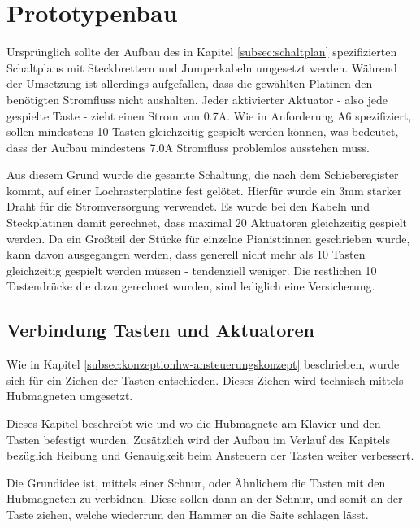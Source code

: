 \section{Prototypenbau} \label{Prototyp}

Ursprünglich sollte der Aufbau des in Kapitel \ref{subsec:schaltplan} spezifizierten Schaltplans mit Steckbrettern und Jumperkabeln umgesetzt werden.
Während der Umsetzung ist allerdings aufgefallen, dass die gewählten Platinen den benötigten Stromfluss nicht aushalten. \newline
Jeder aktivierter Aktuator - also jede gespielte Taste - zieht einen Strom von 0.7A.
Wie in Anforderung A6 spezifiziert, sollen mindestens 10 Tasten gleichzeitig gespielt werden können, was bedeutet, dass der Aufbau mindestens 7.0A Stromfluss problemlos ausstehen muss.

Aus diesem Grund wurde die gesamte Schaltung, die nach dem Schieberegister kommt, auf einer Lochrasterplatine fest gelötet.
Hierfür wurde ein 3mm starker Draht für die Stromversorgung verwendet. \newline
Es wurde bei den Kabeln und Steckplatinen damit gerechnet, dass maximal 20 Aktuatoren gleichzeitig gespielt werden.
Da ein Großteil der Stücke für einzelne Pianist:innen geschrieben wurde, kann davon ausgegangen werden, dass
generell nicht mehr als 10 Tasten gleichzeitig gespielt werden müssen - tendenziell weniger. Die restlichen 10
Tastendrücke die dazu gerechnet wurden, sind lediglich eine Versicherung.

\subsection{Verbindung Tasten und Aktuatoren} \label{subsec:VerbindungTastenAktuatoren}

Wie in Kapitel \ref{subsec:konzeptionhw-ansteuerungskonzept} beschrieben, wurde sich für ein Ziehen der Tasten entschieden.
Dieses Ziehen wird technisch mittels Hubmagneten umgesetzt.

Dieses Kapitel beschreibt wie und wo die Hubmagnete am Klavier und den Tasten befestigt wurden.
Zusätzlich wird der Aufbau im Verlauf des Kapitels bezüglich Reibung und Genauigkeit beim Ansteuern der Tasten weiter verbessert.

Die Grundidee ist, mittels einer Schnur, oder Ähnlichem die Tasten mit den Hubmagneten zu verbidnen.
Diese sollen dann an der Schnur, und somit an der Taste ziehen, welche wiederrum den Hammer an die Saite schlagen lässt.

